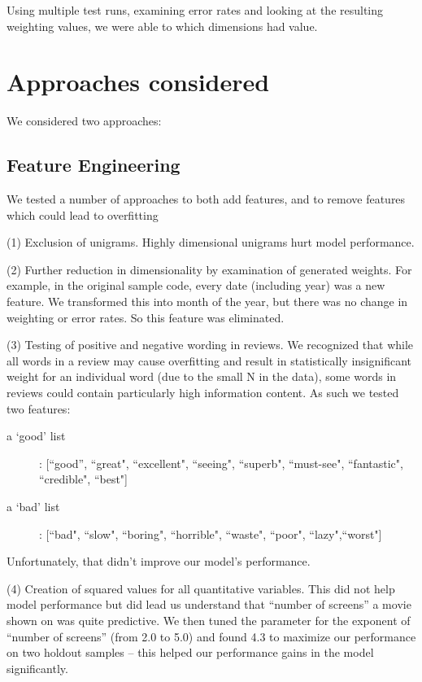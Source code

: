\documentclass[11pt, oneside]{article}   	%
\begin{document}
Using multiple test runs, examining error rates and looking at the resulting weighting values, we were able to which dimensions had value.



\section*{Approaches considered}
We considered two approaches: 


\subsection*{Feature Engineering}
We tested a number of approaches to both add features, and to remove features which could lead to overfitting

(1) Exclusion of unigrams.  Highly dimensional unigrams hurt model performance.

(2) Further reduction in dimensionality by examination of generated weights. For example, in the original sample code, every date (including year) was a new feature. We transformed this into month of the year, but there was no change in weighting or error rates. So this feature was eliminated.

(3) Testing of positive and negative wording in reviews. We recognized that while all words in a review may cause overfitting and result in statistically insignificant weight for an individual word (due to the small N in the data), some words in reviews could contain particularly high information content. As such we tested two features:
\begin{description}
  \item[a `good' list]: [``good'', ``great", ``excellent", ``seeing", ``superb", ``must-see", ``fantastic", ``credible", ``best"]
  \item[a `bad' list]: [``bad", ``slow", ``boring", ``horrible", ``waste", ``poor", ``lazy",``worst"]
\end{description}
Unfortunately, that didn't improve our model's performance.

(4) Creation of squared values for all quantitative variables. This did not help model performance but did lead us understand that ``number of screens'' a movie shown on was quite predictive. We then tuned the parameter for the exponent of ``number of screens'' (from 2.0 to 5.0) and found 4.3 to maximize our performance on two holdout samples -- this helped our performance gains in the model significantly.
\end{document}
